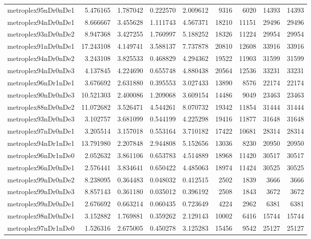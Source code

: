 \begin{longtable}{|l|r|r|r|r|r|r|r|r|}
metroplex95nDr0nDe1 & 5.476165 & 1.787042 & 0.222570 & 2.009612 & 9316 & 6020 & 14393 & 14393 \\
metroplex94nDr0nDe1 & 8.666667 & 3.455628 & 1.111743 & 4.567371 & 18210 & 11151 & 29496 & 29496 \\
metroplex93nDr0nDe2 & 8.947368 & 3.427255 & 1.760997 & 5.188252 & 18326 & 11224 & 29954 & 29954 \\
metroplex91nDr0nDe1 & 17.243108 & 4.149741 & 3.588137 & 7.737878 & 20810 & 12608 & 33916 & 33916 \\
metroplex94nDr0nDe2 & 3.243108 & 3.825533 & 0.468829 & 4.294362 & 19522 & 11903 & 31599 & 31599 \\
metroplex94nDr0nDe3 & 4.137845 & 4.224690 & 0.655748 & 4.880438 & 20564 & 12536 & 33231 & 33231 \\
metroplex96nDr1nDe1 & 3.676692 & 2.631880 & 0.395553 & 3.027433 & 13890 & 8576 & 22174 & 22174 \\
metroplex90nDr0nDe3 & 10.521303 & 2.400086 & 1.209068 & 3.609154 & 14486 & 9049 & 23463 & 23463 \\
metroplex88nDr0nDe2 & 11.072682 & 3.526471 & 4.544261 & 8.070732 & 19342 & 11854 & 31444 & 31444 \\
metroplex93nDr0nDe3 & 3.102757 & 3.681099 & 0.544199 & 4.225298 & 19416 & 11877 & 31648 & 31648 \\
metroplex97nDr0nDe1 & 3.205514 & 3.157018 & 0.553164 & 3.710182 & 17422 & 10681 & 28314 & 28314 \\
metroplex94nDr1nDe1 & 13.791980 & 2.207848 & 2.944808 & 5.152656 & 13036 & 8230 & 20950 & 20950 \\
metroplex96nDr1nDe0 & 2.052632 & 3.861106 & 0.653783 & 4.514889 & 18968 & 11420 & 30517 & 30517 \\
metroplex96nDr0nDe1 & 2.576441 & 3.834641 & 0.650422 & 4.485063 & 18974 & 11424 & 30525 & 30525 \\
metroplex99nDr0nDe2 & 8.238095 & 0.364483 & 0.048032 & 0.412515 & 2502 & 1839 & 3666 & 3666 \\
metroplex99nDr0nDe3 & 8.857143 & 0.361180 & 0.035012 & 0.396192 & 2508 & 1843 & 3672 & 3672 \\
metroplex99nDr0nDe1 & 2.676692 & 0.663214 & 0.060435 & 0.723649 & 4224 & 2962 & 6381 & 6381 \\
metroplex98nDr0nDe1 & 3.152882 & 1.769881 & 0.359262 & 2.129143 & 10002 & 6416 & 15744 & 15744 \\
metroplex97nDr1nDe0 & 1.526316 & 2.675005 & 0.450278 & 3.125283 & 15456 & 9542 & 25127 & 25127 \\

\end{longtable}

